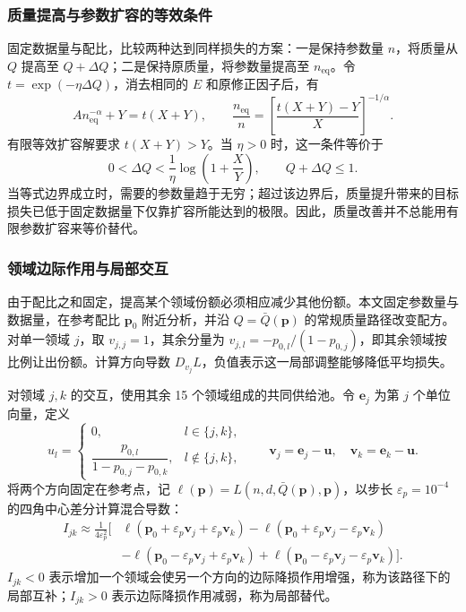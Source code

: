\documentclass[bwprint]{gmcmthesis}
\begin{document}
        \subsubsection{质量提高与参数扩容的等效条件}  %
        固定数据量与配比，比较两种达到同样损失的方案：一是保持参数量 $n$，将质量从 $Q$ 提高至 $Q+\Delta Q$；二是保持原质量，将参数量提高至 $n_{\mathrm{eq}}$。令 $t=\exp(-\eta\Delta Q)$，消去相同的 $E$ 和原修正因子后，有
        \begin{equation}
         A n_{\mathrm{eq}}^{-\alpha}+Y=t(X+Y),\qquad
         \frac{n_{\mathrm{eq}}}{n}=\left[\frac{t(X+Y)-Y}{X}\right]^{-1/\alpha}.
         \label{eq:p2_equiv}
        \end{equation}
        有限等效扩容解要求 $t(X+Y)>Y$。当 $\eta>0$ 时，这一条件等价于
        \begin{equation}
         0<\Delta Q<\frac1\eta\log\left(1+\frac XY\right),\qquad Q+\Delta Q\leq1.
         \label{eq:p2_equiv_bound}
        \end{equation}
        当等式边界成立时，需要的参数量趋于无穷；超过该边界后，质量提升带来的目标损失已低于固定数据量下仅靠扩容所能达到的极限。因此，质量改善并不总能用有限参数扩容来等价替代。
    
        \subsubsection{领域边际作用与局部交互}  %
        由于配比之和固定，提高某个领域份额必须相应减少其他份额。本文固定参数量与数据量，在参考配比 $\bm p_0$ 附近分析，并沿 $Q=\bar Q(\bm p)$ 的常规质量路径改变配方。对单一领域 $j$，取 $v_{j,j}=1$，其余分量为 $v_{j,l}=-p_{0,l}/(1-p_{0,j})$，即其余领域按比例让出份额。计算方向导数 $D_{v_j}L$，负值表示这一局部调整能够降低平均损失。
        
        对领域 $j,k$ 的交互，使用其余 15 个领域组成的共同供给池。令 $\bm e_j$ 为第 $j$ 个单位向量，定义
        \begin{equation}
         u_l=\begin{cases}0,&l\in\{j,k\},\\
         \dfrac{p_{0,l}}{1-p_{0,j}-p_{0,k}},&l\notin\{j,k\},\end{cases}
         \qquad \bm v_j=\bm e_j-\bm u,\quad \bm v_k=\bm e_k-\bm u.
         \label{eq:p2_pool}
        \end{equation}
        将两个方向固定在参考点，记 $\ell(\bm p)=L(n,d,\bar Q(\bm p),\bm p)$，以步长 $\varepsilon_p=10^{-4}$ 的四角中心差分计算混合导数：
        \begin{equation}
         \begin{aligned}
         I_{jk}\approx\frac1{4\varepsilon_p^2}\big[&\ell(\bm p_0+\varepsilon_p\bm v_j+\varepsilon_p\bm v_k)
         -\ell(\bm p_0+\varepsilon_p\bm v_j-\varepsilon_p\bm v_k)\\
         &-\ell(\bm p_0-\varepsilon_p\bm v_j+\varepsilon_p\bm v_k)
         +\ell(\bm p_0-\varepsilon_p\bm v_j-\varepsilon_p\bm v_k)\big].
         \end{aligned}
         \label{eq:p2_interaction}
        \end{equation}
        $I_{jk}<0$ 表示增加一个领域会使另一个方向的边际降损作用增强，称为该路径下的局部互补；$I_{jk}>0$ 表示边际降损作用减弱，称为局部替代。
\end{document}
